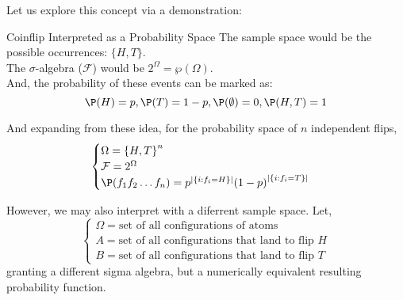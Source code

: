 Let us explore this concept via a demonstration:
\begin{ln-explain}{Coinflip Interpreted as a Probability Space}{}
    The sample space would be the possible occurrences: $\{H, T\}$. \\
    The $\sigma$-algebra ($\mathcal{F}$) would be $2^\Omega = \wp(\Omega)$. \\
    And, the probability of these events can be marked as:
    \[\P(H) = p, \P(T) = 1 - p, \P(\emptyset) = 0, \P({H, T}) = 1\]

    And expanding from these idea, for the probability space of $n$ independent flips,
    \[
        \begin{cases}
            \Omega = {\{H, T\}}^n \\
            \mathcal{F} = 2^\Omega \\
            \P(f_1 f_2 \dots f_n) = p^{|\{i:f_i = H\}|} {(1 - p)}^{|\{i:f_i = T\}|}
        \end{cases}
    \]

    However, we may also interpret with a diferrent sample space. Let,
    \[
        \begin{cases}
            \Omega = \text{set of all configurations of atoms} \\
            A = \text{set of all configurations that land to flip $H$} \\
            B = \text{set of all configurations that land to flip $T$}
        \end{cases}
    \]
    granting a different sigma algebra, but a numerically equivalent resulting probability function.
\end{ln-explain}

